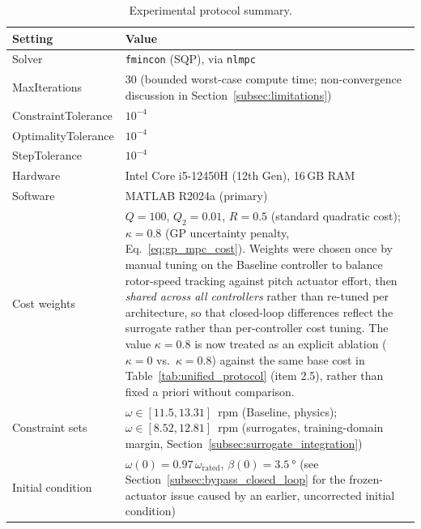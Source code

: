 \begin{table}[H]
	\centering
	\caption{Experimental protocol summary.}
	\label{tab:protocol_summary}
	\small
	
	
	\begin{tabularx}{\textwidth}{
			>{\raggedright\arraybackslash}p{4cm}
			>{\raggedright\arraybackslash}X
		}
		\toprule
		Setting & Value \\
		\midrule
		
		Solver
		& \texttt{fmincon} (SQP), via \texttt{nlmpc} \\
		
		MaxIterations
		& $30$ (bounded worst-case compute time; non-convergence discussion in Section~\ref{subsec:limitations}) \\
		
		ConstraintTolerance
		& $10^{-4}$ \\
		
		OptimalityTolerance
		& $10^{-4}$ \\
		
		StepTolerance
		& $10^{-4}$ \\
		
		Hardware
		& Intel Core i5-12450H (12th Gen), 16\,GB RAM \\
		
		Software
		& MATLAB R2024a (primary) \\
		
		Cost weights
		& $Q=100$, $Q_2=0.01$, $R=0.5$ (standard quadratic cost);
		$\kappa=0.8$ (GP uncertainty penalty, Eq.~\ref{eq:gp_mpc_cost}).
		Weights were chosen once by manual tuning on the Baseline controller
		to balance rotor-speed tracking against pitch actuator effort, then
		\emph{shared across all controllers} rather than re-tuned per
		architecture, so that closed-loop differences reflect the surrogate
		rather than per-controller cost tuning. The value $\kappa=0.8$ is
		now treated as an explicit ablation ($\kappa=0$ vs.\ $\kappa=0.8$)
		against the same base cost in Table~\ref{tab:unified_protocol}
		(item 2.5), rather than fixed a priori without comparison. \\
		
		Constraint sets
		& $\omega\in[11.5,13.31]$~rpm (Baseline, physics);
		$\omega\in[8.52,12.81]$~rpm (surrogates, training-domain margin,
		Section~\ref{subsec:surrogate_integration}) \\
		
		Initial condition
		& $\omega(0)=0.97\,\omega_{\text{rated}}$,
		$\beta(0)=\SI{3.5}{\degree}$ (see Section~\ref{subsec:bypass_closed_loop}
		for the frozen-actuator issue caused by an earlier, uncorrected
		initial condition) \\
		

\end{tabularx}
\end{table}
